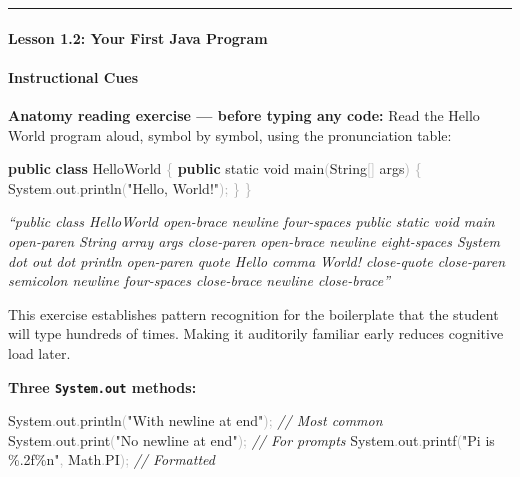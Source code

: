\documentclass[
  justified,
  openright,
]{tufte-book}
\let\subsection\paragraph
\let\paragraph\paragraph
\newcommand{\KeywordTok}[1]{\textcolor{CodeKeyword}{\textbf{#1}}}  %
\newcommand{\StringTok}[1]{\textcolor{CodeString}{#1}}              %
\newcommand{\CommentTok}[1]{\textcolor{CodeComment}{\textit{#1}}}  %
\newcommand{\CodeFuncTok}[1]{\textcolor{CodeKeyword}{#1}}           %
\newcommand{\CodeTypeTok}[1]{\textcolor{CodeType}{#1}}              %
\newcommand{\OperatorTok}[1]{\textcolor{DarkGray}{#1}}              %
\newenvironment{Shaded}{%
  \begin{mdframed}[style=TufteCode]%
}{%
  \end{mdframed}%
}
\let\subsection\paragraph
\let\paragraph\paragraph
\begin{document}
\begin{center}\rule{0.5\linewidth}{0.5pt}\end{center}

\subsection{Lesson 1.2: Your First Java
Program}\label{lesson-1.2-your-first-java-program}

\paragraph{Instructional Cues}\label{instructional-cues-22}

\textbf{Anatomy reading exercise --- before typing any code:} Read the
Hello World program aloud, symbol by symbol, using the pronunciation
table:

\begin{Shaded}
\begin{Highlighting}[]
\KeywordTok{public} \KeywordTok{class} HelloWorld \OperatorTok{\{}
    \KeywordTok{public} \CodeTypeTok{static} \CodeTypeTok{void} \CodeFuncTok{main}\OperatorTok{(}String\OperatorTok{[]} args\OperatorTok{)} \OperatorTok{\{}
        System\OperatorTok{.}\CodeFuncTok{out}\OperatorTok{.}\CodeFuncTok{println}\OperatorTok{(}\StringTok{"Hello, World!"}\OperatorTok{);}
    \OperatorTok{\}}
\OperatorTok{\}}
\end{Highlighting}
\end{Shaded}

\emph{``public class HelloWorld open-brace newline four-spaces public
static void main open-paren String array args close-paren open-brace
newline eight-spaces System dot out dot println open-paren quote Hello
comma World! close-quote close-paren semicolon newline four-spaces
close-brace newline close-brace''}

This exercise establishes pattern recognition for the boilerplate that
the student will type hundreds of times. Making it auditorily familiar
early reduces cognitive load later.

\textbf{Three \texttt{System.out} methods:}

\begin{Shaded}
\begin{Highlighting}[]
System\OperatorTok{.}\CodeFuncTok{out}\OperatorTok{.}\CodeFuncTok{println}\OperatorTok{(}\StringTok{"With newline at end"}\OperatorTok{);}     \CommentTok{// Most common}
System\OperatorTok{.}\CodeFuncTok{out}\OperatorTok{.}\CodeFuncTok{print}\OperatorTok{(}\StringTok{"No newline at end"}\OperatorTok{);}          \CommentTok{// For prompts}
System\OperatorTok{.}\CodeFuncTok{out}\OperatorTok{.}\CodeFuncTok{printf}\OperatorTok{(}\StringTok{"Pi is }\StringTok{\%.2f\%n}\StringTok{"}\OperatorTok{,} Math\OperatorTok{.}\CodeFuncTok{PI}\OperatorTok{);}    \CommentTok{// Formatted}
\end{Highlighting}
\end{Shaded}
\end{document}
